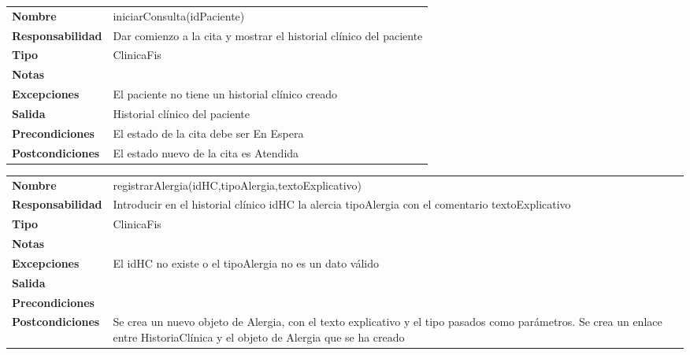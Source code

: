 \begin{table}[htbp]
	  \begin{tabularx}{\textwidth}{l|l}
    \textbf{Nombre}        & iniciarConsulta(idPaciente) \\ 
    \textbf{Responsabilidad}  & Dar comienzo a la cita y mostrar el historial clínico del paciente \\ 
    \textbf{Tipo}        &  ClinicaFis\\ 
    \textbf{Notas}        &  \\ 
    \textbf{Excepciones}    & El paciente no tiene un historial clínico creado \\ 
    \textbf{Salida}        & Historial clínico del paciente \\ 
    \textbf{Precondiciones}    & El estado de la cita debe ser En Espera \\ 
    \textbf{Postcondiciones}  &  El estado nuevo de la cita es Atendida\\ 
  \end{tabularx}

\end{table}


\begin{table}[htbp]
	  \begin{tabularx}{\textwidth}{l|l}
    \textbf{Nombre}        & registrarAlergia(idHC,tipoAlergia,textoExplicativo) \\ 
    \textbf{Responsabilidad}  & Introducir en el historial clínico idHC la alercia tipoAlergia con el comentario textoExplicativo \\ 
    \textbf{Tipo}        & ClinicaFis \\ 
    \textbf{Notas}        &  \\ 
    \textbf{Excepciones}    & El idHC no existe o el tipoAlergia no es un dato válido \\ 
    \textbf{Salida}        &  \\ 
    \textbf{Precondiciones}    &  \\ 
    \textbf{Postcondiciones}  &  Se crea un nuevo objeto de Alergia, con el texto explicativo y el tipo pasados como parámetros.
    Se crea un enlace  entre HistoriaClínica y el objeto de Alergia que se ha creado \\ 
  \end{tabularx}

\end{table}


